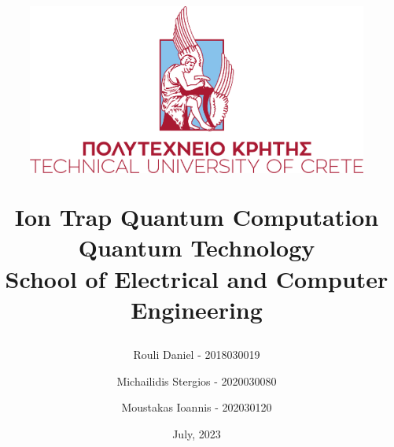 \documentclass[11pt, a4paper, twoside, table, tbtags]{report}
\title{
\begin{figure}[t!]
    \centering
    \includegraphics[scale = 0.8]{images/logo_TUC.png}
\end{figure}

\huge{Ion Trap Quantum Computation}\\
\vspace{10mm}
\Large{Quantum Technology}\\
\vspace{5mm}
\small{School of Electrical and Computer Engineering}\\
\vspace{15mm}
}
\author{Rouli Daniel - 2018030019\and Michailidis Stergios - 2020030080 \and Moustakas Ioannis - 202030120
\vspace{35mm}}
\date{July, 2023}
\begin{document}
\makeatletter
\let\ps@plain\ps@empty
\makeatother

\maketitle
\tableofcontents

\newpage


\newpage


\newpage



\end{document}
